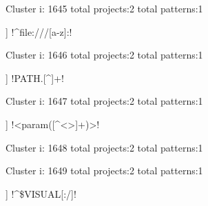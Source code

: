 Cluster i: 1645
total projects:2
total patterns:1
\begin{multicols}{1}
\begin{description}[noitemsep,topsep=0pt]
\item [[2] ] \cverb!^file:///[a-z]:!
\end{description}
\end{multicols}







Cluster i: 1646
total projects:2
total patterns:1
\begin{multicols}{1}
\begin{description}[noitemsep,topsep=0pt]
\item [[2] ] \cverb!PATH.[^\s]+\s!
\end{description}
\end{multicols}







Cluster i: 1647
total projects:2
total patterns:1
\begin{multicols}{1}
\begin{description}[noitemsep,topsep=0pt]
\item [[2] ] \cverb!<param([^<>]+)>!
\end{description}
\end{multicols}







Cluster i: 1648
total projects:2
total patterns:1
\begin{multicols}{1}
\end{multicols}







Cluster i: 1649
total projects:2
total patterns:1
\begin{multicols}{1}
\begin{description}[noitemsep,topsep=0pt]
\item [[2] ] \cverb!^\${VISUAL[:}/]!
\end{description}
\end{multicols}








